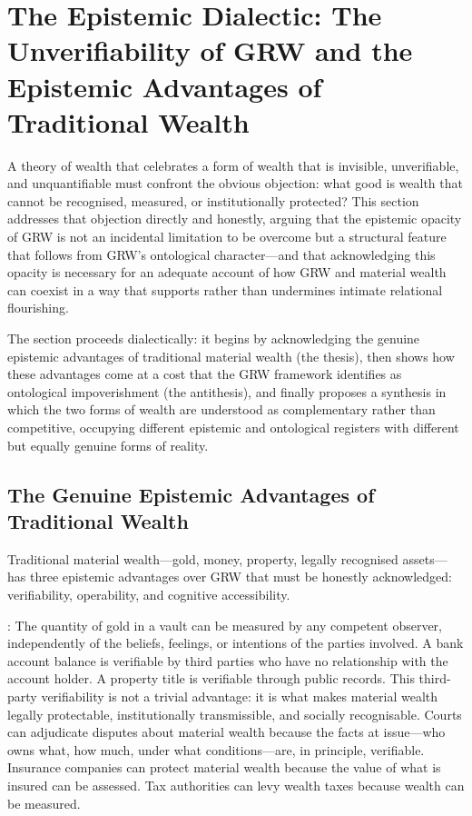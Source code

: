 \section{The Epistemic Dialectic: The Unverifiability of GRW and the Epistemic Advantages of Traditional Wealth}
\label{p15:sec:epistemology}

\noindent
A theory of wealth that celebrates a form of wealth that is invisible, unverifiable, and unquantifiable must confront the obvious objection: what good is wealth that cannot be recognised, measured, or institutionally protected? This section addresses that objection directly and honestly, arguing that the epistemic opacity of GRW is not an incidental limitation to be overcome but a structural feature that follows from GRW's ontological character---and that acknowledging this opacity is necessary for an adequate account of how GRW and material wealth can coexist in a way that supports rather than undermines intimate relational flourishing.

The section proceeds dialectically: it begins by acknowledging the genuine epistemic advantages of traditional material wealth (the thesis), then shows how these advantages come at a cost that the GRW framework identifies as ontological impoverishment (the antithesis), and finally proposes a synthesis in which the two forms of wealth are understood as complementary rather than competitive, occupying different epistemic and ontological registers with different but equally genuine forms of reality.

\subsection{The Genuine Epistemic Advantages of Traditional Wealth}
\label{p15:subsec:epistemic_advantages}

\noindent
Traditional material wealth---gold, money, property, legally recognised assets---has three epistemic advantages over GRW that must be honestly acknowledged: verifiability, operability, and cognitive accessibility.

: The quantity of gold in a vault can be measured by any competent observer, independently of the beliefs, feelings, or intentions of the parties involved. A bank account balance is verifiable by third parties who have no relationship with the account holder. A property title is verifiable through public records. This third-party verifiability is not a trivial advantage: it is what makes material wealth legally protectable, institutionally transmissible, and socially recognisable. Courts can adjudicate disputes about material wealth because the facts at issue---who owns what, how much, under what conditions---are, in principle, verifiable. Insurance companies can protect material wealth because the value of what is insured can be assessed. Tax authorities can levy wealth taxes because wealth can be measured.


